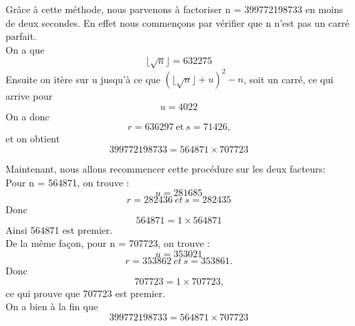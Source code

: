 \begin{example}
   Grâce à cette méthode, nous parvenons à factoriser n = 399772198733 en moins de deux secondes.
   En effet nous commençons par vérifier que n n'est pas un carré parfait. \\ 
   On a que \[\lfloor \sqrt{n} \rfloor = 632275\]
    Ensuite on itère sur u jusqu'à ce que $(\lfloor \sqrt{n} \rfloor + u) ^ 2 - n$, soit un carré, ce qui arrive pour  \[u = 4022\]
    On a donc \[r = 636297 ~ \textrm{et} ~ s = 71426 \textrm{,}\]
    et on obtient \[399772198733 = 564871 \times 707723\]

    Maintenant, nous allons recommencer cette procédure sur les deux facteurs:\\
    Pour n = 564871, on trouve :
    \[u = 281685\]
    \[r = 282436 ~ et ~ s = 282435\]
    Donc \[564871 = 1 \times  564871\]
    Ainsi 564871 est premier. \\

    De la même façon, pour n = 707723, on trouve :
    \[u = 353021\]
    \[r = 353862 ~ et ~ s = 353861 \textrm{.}\]
    Donc \[707723 = 1 \times  707723\textrm{,}\]
    ce qui prouve que 707723 est premier. \\

    On a bien à la fin que \[399772198733 = 564871 \times 707723\]
    
\end{example}